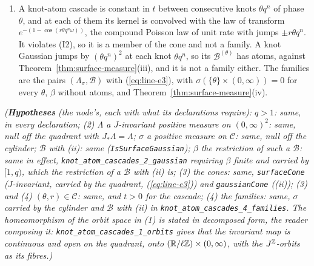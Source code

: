 \begin{theorem}
\begin{enumerate}
$\Lambda^{(\theta,r)}$ are the \emph{knot-atom cascade}
\begin{equation}\label{eq:line-e4}
  \Psi^{(\theta,r)}_t(\omega) = \sum_{n :\ \theta q^n \le t}\bigl(1 - \cos(\omega\,r\theta q^n)\bigr).
\end{equation}
The extreme rays of the cone of the $\mathcal{B}$ are those of
$\mathcal{B}^{(\theta)} := \sum_n(\theta q^n)^2\delta_{\theta q^n}$, the \emph{knot Gaussians}
$a(t) = \sum_{n :\ \theta q^n \le t}(\theta q^n)^2$.
\item A knot-atom cascade is constant in $t$ between consecutive knots $\theta q^n$ of phase
$\theta$, and at each of them its kernel is convolved with the law of transform
$e^{-(1 - \cos(r\theta q^n\omega))}$, the compound Poisson law of unit rate with jumps
$\pm r\theta q^n$. It violates (I2), so it is a member of the cone and not a family. A knot
Gaussian jumps by $(\theta q^n)^2$ at each knot $\theta q^n$, so its $\mathcal{B}^{(\theta)}$ has
atoms, against Theorem~\ref{thm:surface-measure}(iii), and it is not a family either. The families
are the pairs $(\Lambda_\sigma, \mathcal{B})$ with (\ref{eq:line-e3}), with $\sigma(\{\theta\} \times (0,\infty)) = 0$
for every $\theta$, $\beta$ without atoms, and Theorem~\ref{thm:surface-measure}(iv).
\end{enumerate}
\statusT\quad\emph{(\textbf{Hypotheses} (the node's, each with what its declarations require):
$q > 1$: same, in every declaration; (2) $\Lambda$ a $J$-invariant positive measure on
$(0,\infty)^2$: same, null off the quadrant with $J_*\Lambda = \Lambda$; $\sigma$ a positive measure
on $\mathcal{C}$: same, null off the cylinder; $\mathcal{B}$ with (ii): same
(\texttt{IsSurfaceGaussian}); $\beta$ the restriction of such a $\mathcal{B}$: same in effect,
\texttt{knot\_atom\_cascades\_2\_gaussian} requiring $\beta$ finite and carried by $[1,q)$, which the
restriction of a $\mathcal{B}$ with (ii) is; (3) the cones: same, \texttt{surfaceCone} ($J$-invariant,
carried by the quadrant, (\ref{eq:line-e3})) and \texttt{gaussianCone} ((ii)); (3) and (4) $(\theta, r) \in
\mathcal{C}$: same, and $t > 0$ for the cascade; (4) the families: same, $\sigma$ carried by the
cylinder and $\mathcal{B}$ with (ii) in \texttt{knot\_atom\_cascades\_4\_families}. The homeomorphism
of the orbit space in (1) is stated in decomposed form, the reader composing it:
\texttt{knot\_atom\_cascades\_1\_orbits} gives that the invariant map is continuous and open on the
quadrant, onto $(\mathbb{R}/\ell\mathbb{Z}) \times (0,\infty)$, with the $J^{\mathbb{Z}}$-orbits as its fibres.)}
\end{theorem}

